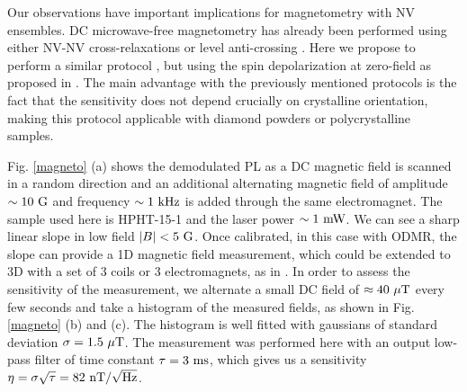 \documentclass[preprintnumbers,amsmath,amssymb,superscriptaddress,twocolumn,showpacs]{revtex4-2}
\begin{document}
Our observations have important implications for magnetometry with NV ensembles.
DC microwave-free magnetometry has already been performed using either NV-NV cross-relaxations \citep{akhmedzhanov_microwave-free_2017,akhmedzhanov_magnetometry_2019} or level anti-crossing \citep{Wickenbrock, zheng2017level, zheng_microwave-free_2020}. Here we propose to perform a similar protocol , but using the spin depolarization at zero-field as proposed in \cite{filimonenko2018weak, filimonenko2022manifestation}. The main advantage with the previously mentioned protocols is the fact that the sensitivity does not depend crucially on crystalline orientation, making this protocol applicable with diamond powders or polycrystalline samples. 

Fig. \ref{magneto} (a) shows the demodulated PL as a DC magnetic field is scanned in a random direction and an additional alternating magnetic field of amplitude $\sim 10\ \rm G$ and frequency  $\sim 1\ \rm kHz$ is added through the same electromagnet. The sample used here is HPHT-15-1 and the laser power $\sim 1\ \rm mW$.  We can see a sharp linear slope in low field $\abs{B} < 5\ \rm G$. Once calibrated, in this case with ODMR, the slope can provide a 1D magnetic field measurement, which could be extended to 3D with a set of 3 coils or 3 electromagnets, as in \cite{zheng_microwave-free_2020}. In order to assess the sensitivity of the measurement, we alternate a small DC field of $\approx 40\ \mu\rm{T}$ every few seconds and take a histogram of the measured fields, as shown in Fig. \ref{magneto} (b) and (c). The histogram is well fitted with gaussians of standard deviation $\sigma=1.5\ \mu \rm T$. The measurement was performed here with an output low-pass filter of time constant $\tau=3\ \rm ms$, which gives us a sensitivity $\eta=\sigma \sqrt{\tau}=82\ \rm{nT}/\sqrt{\rm Hz}$.
\end{document}
